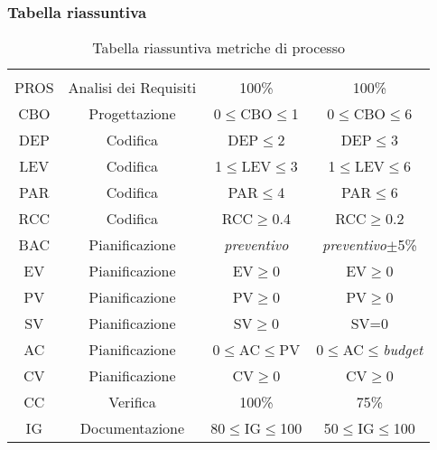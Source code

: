 \subsubsection{Tabella riassuntiva}
\begin{table}[H]
	\begin{center}
				\caption{Tabella riassuntiva metriche di processo}
		\begin{tabular}{cc!{\color[HTML]{9b240a}\vrule width 0.05cm}cc}
			\rowcolorhead
			 &  &  &  \\

			PROS & Analisi dei Requisiti & 100\% & 100\%\\
			CBO & Progettazione & 0$\leq$CBO$\leq$1 & 0$\leq$CBO$\leq$6\\
			DEP & Codifica & DEP$\leq$2 & DEP$\leq$3\\
			LEV & Codifica & 1$\leq$LEV$\leq$3 & 1$\leq$LEV$\leq$6\\
			PAR & Codifica & PAR$\leq$4 & PAR$\leq$6\\
			RCC & Codifica & RCC$\geq$0.4 & RCC$\geq$0.2\\
			BAC & Pianificazione & \textit{preventivo} & \textit{preventivo}$\pm$5\%\\
			EV & Pianificazione & EV$\geq$0 & EV$\geq$0\\
			PV & Pianificazione & PV$\geq$0 & PV$\geq$0\\
			SV & Pianificazione & SV$\geq$0 & SV=0\\
			AC & Pianificazione & 0$\leq$AC$\leq$PV & 0$\leq$AC$\leq$\textit{budget}\\
			CV & Pianificazione & CV$\geq$0 & CV$\geq$0\\
			CC & Verifica & 100\% & 75\%\\
			IG & Documentazione & 80$\leq$IG$\leq$100 & 50$\leq$IG$\leq$100\\
		\end{tabular}

	\end{center}
\end{table}